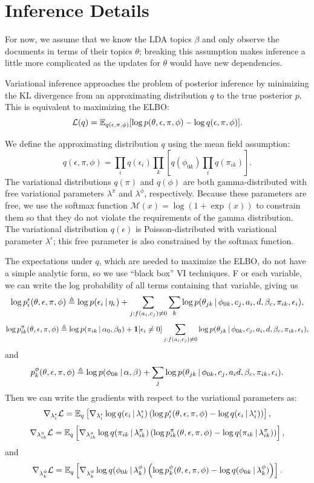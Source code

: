 \section{Inference Details}
\label{sec:appendix_inference}
For now, we assume that we know the LDA topics $\beta$ and only observe the documents in terms of their topics $\theta$; breaking this assumption makes inference a little more complicated as the updates for $\theta$ would have new dependencies.

Variational inference approaches the problem of posterior inference by minimizing the KL divergence from an approximating distribution $q$ to the true posterior $p$.
This is equivalent to maximizing the ELBO: \[\mathcal{L}(q)  = \mathbb{E}_{q(\epsilon, \pi, \phi)}[\log p(\theta,\epsilon,\pi,\phi) - \log q(\epsilon, \pi, \phi)].\]

We define the approximating distribution $q$ using the mean field assumption: \[q(\epsilon, \pi, \phi) = \prod_i q(\epsilon_{i})\prod_k\left[q(\phi_{0k})\prod_i q(\pi_{ik})\right].\]
The variational distributions $q(\pi)$ and $q(\phi)$ are both gamma-distributed with free variational parameters $\lambda^\pi$ and $\lambda^\phi$, respectively.  Because these parameters are free, we use the softmax function $\mathcal{M}(x) = \log(1+\exp(x))$ to constrain them so that they do not violate the requirements of the gamma distribution.
The variational distribution $q(\epsilon)$ is Poisson-distributed with variational parameter $\lambda^\epsilon$; this free parameter is also constrained by the softmax function.

The expectations under $q$, which are needed to maximize the ELBO, do not have a simple analytic form, so we use ``black box'' VI techniques.
F or each variable, we can write the log probability of all terms containing that variable, giving us 
\[\log p^\epsilon_{i}(\theta, \epsilon, \pi, \phi) \triangleq \log p(\epsilon_{i} \, | \, \eta_\epsilon) + \sum_{j : f(a_i, c_j) \neq 0}\sum_k\log p(\theta_{jk} \, | \, \phi_{0k}, c_j, a_i, d, \beta_c, \pi_{ik}, \epsilon_i),\]
\[\log p^\pi_{ik}(\theta, \epsilon, \pi, \phi) \triangleq \log p(\pi_{ik} \, | \, \alpha_0, \beta_0) + \mathbf{1}[\epsilon_i \neq 0] \sum_{j : f(a_i, c_j) \neq 0}\log p(\theta_{jk} \, | \, \phi_{0k}, c_j, a_i, d, \beta_c, \pi_{ik}, \epsilon_i),\]
and
\[p^\phi_{k}(\theta, \epsilon, \pi, \phi) \triangleq \log p(\phi_{0k} \, | \, \alpha, \beta) + \sum_{j} \log p(\theta_{jk} \, | \, \phi_{0k}, c_j, a_i d, \beta_c, \pi_{ik}, \epsilon_i).\]
Then we can write the gradients with respect to the variational parameters as:
\[\nabla_{\lambda^\epsilon_{i}} \mathcal{L} = \mathbb{E}_q \left[ \nabla_{\lambda^\epsilon_{i}} \log q(\epsilon_{i} \, | \, \lambda^\epsilon_{i}) \left( \log p^\epsilon_{i}(\theta, \epsilon, \pi, \phi) - \log q(\epsilon_{i} \, | \, \lambda^\epsilon_{i}) \right)\right],\]
\[\nabla_{\lambda^\pi_{ik}} \mathcal{L} = \mathbb{E}_q \left[ \nabla_{\lambda^\pi_{ik}} \log q(\pi_{ik} \, | \, \lambda^\pi_{ik}) \left( \log p^\pi_{ik}(\theta, \epsilon, \pi, \phi) - \log q(\pi_{ik} \, | \, \lambda^\pi_{ik}) \right)\right],\]
and
\[\nabla_{\lambda^\phi_{k}} \mathcal{L} = \mathbb{E}_q \left[ \nabla_{\lambda^\phi_{k}} \log q(\phi_{0k} \, | \, \lambda^\phi_{k}) \left( \log p^\phi_{k}(\theta, \epsilon, \pi, \phi) - \log q(\phi_{0k} \, | \, \lambda^\phi_{k}) \right)\right].\]

